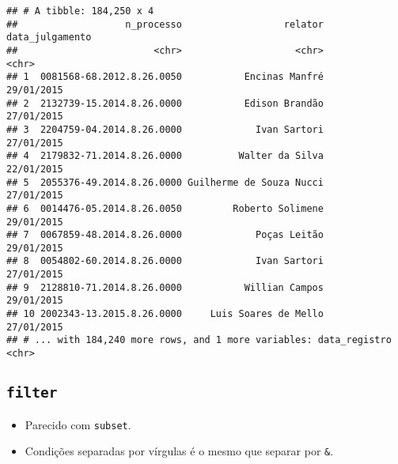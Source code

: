 \documentclass[]{book}
\newenvironment{Shaded}{\begin{snugshade}}{\end{snugshade}}
\newcommand{\KeywordTok}[1]{\textcolor[rgb]{0.13,0.29,0.53}{\textbf{{#1}}}}
\newcommand{\DataTypeTok}[1]{\textcolor[rgb]{0.13,0.29,0.53}{{#1}}}
\newcommand{\StringTok}[1]{\textcolor[rgb]{0.31,0.60,0.02}{{#1}}}
\newcommand{\NormalTok}[1]{{#1}}
\providecommand{\tightlist}{%
  \setlength{\itemsep}{0pt}\setlength{\parskip}{0pt}}
\begin{document}
\begin{Shaded}
\end{Shaded}

\begin{verbatim}
## # A tibble: 184,250 x 4
##                   n_processo                  relator data_julgamento
##                        <chr>                    <chr>           <chr>
## 1  0081568-68.2012.8.26.0050           Encinas Manfré      29/01/2015
## 2  2132739-15.2014.8.26.0000           Edison Brandão      27/01/2015
## 3  2204759-04.2014.8.26.0000             Ivan Sartori      27/01/2015
## 4  2179832-71.2014.8.26.0000          Walter da Silva      22/01/2015
## 5  2055376-49.2014.8.26.0000 Guilherme de Souza Nucci      27/01/2015
## 6  0014476-05.2014.8.26.0050         Roberto Solimene      29/01/2015
## 7  0067859-48.2014.8.26.0000             Poças Leitão      29/01/2015
## 8  0054802-60.2014.8.26.0000             Ivan Sartori      27/01/2015
## 9  2128810-71.2014.8.26.0000           Willian Campos      29/01/2015
## 10 2002343-13.2015.8.26.0000     Luis Soares de Mello      27/01/2015
## # ... with 184,240 more rows, and 1 more variables: data_registro <chr>
\end{verbatim}

\subsection{\texorpdfstring{\texttt{filter}}{filter}}\label{filter}

\begin{itemize}
\tightlist
\item
  Parecido com \texttt{subset}.
\item
  Condições separadas por vírgulas é o mesmo que separar por
  \texttt{\&}.
\end{itemize}

\begin{Shaded}
\end{Shaded}
\end{document}
